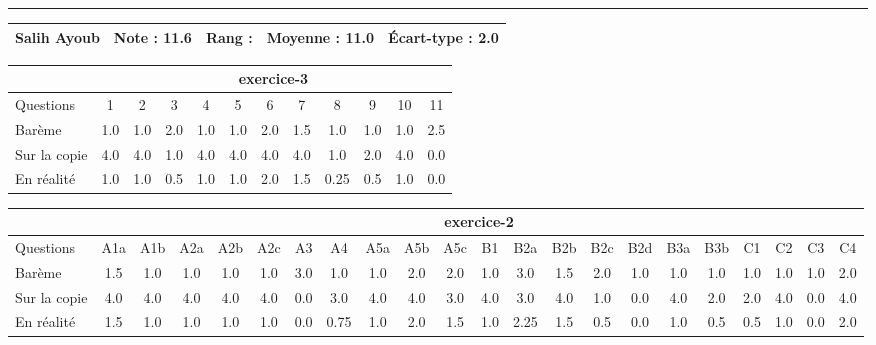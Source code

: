 \documentclass[a4paper, landscape, 10pt]{article}
\begin{document}
\begin{minipage}{\textwidth}
  \end{minipage}
  \vspace{0.3cm}
  \hrule
  \vspace{0.3cm}

  \begin{minipage}{\textwidth}
    { \bf
    \begin{tabular}{|c|*{4}{c|}}
    \hline
      Salih Ayoub & Note : 11.6 & Rang :  & Moyenne : 11.0 & \'Ecart-type : 2.0 \\
    \hline
    \end{tabular}
    }
    
      \begin{tabular}{|l|*{ 11 }{c|}}
        \hline
        & \multicolumn{ 11 }{c|}{ exercice-3 } \\
        \hline
        Questions & 1&2&3&4&5&6&7&8&9&10&11 \\
        \hline
        Barème & 1.0&1.0&2.0&1.0&1.0&2.0&1.5&1.0&1.0&1.0&2.5 \\
        \hline
        Sur la copie & 4.0&4.0&1.0&4.0&4.0&4.0&4.0&1.0&2.0&4.0&0.0 \\
        \hline
        En réalité & 1.0&1.0&0.5&1.0&1.0&2.0&1.5&0.25&0.5&1.0&0.0 \\
        \hline
      \end{tabular}
    
      \begin{tabular}{|l|*{ 21 }{c|}}
        \hline
        & \multicolumn{ 21 }{c|}{ exercice-2 } \\
        \hline
        Questions & A1a&A1b&A2a&A2b&A2c&A3&A4&A5a&A5b&A5c&B1&B2a&B2b&B2c&B2d&B3a&B3b&C1&C2&C3&C4 \\
        \hline
        Barème & 1.5&1.0&1.0&1.0&1.0&3.0&1.0&1.0&2.0&2.0&1.0&3.0&1.5&2.0&1.0&1.0&1.0&1.0&1.0&1.0&2.0 \\
        \hline
        Sur la copie & 4.0&4.0&4.0&4.0&4.0&0.0&3.0&4.0&4.0&3.0&4.0&3.0&4.0&1.0&0.0&4.0&2.0&2.0&4.0&0.0&4.0 \\
        \hline
        En réalité & 1.5&1.0&1.0&1.0&1.0&0.0&0.75&1.0&2.0&1.5&1.0&2.25&1.5&0.5&0.0&1.0&0.5&0.5&1.0&0.0&2.0 \\
        \hline
      \end{tabular}
    

\end{minipage}
\end{document}
